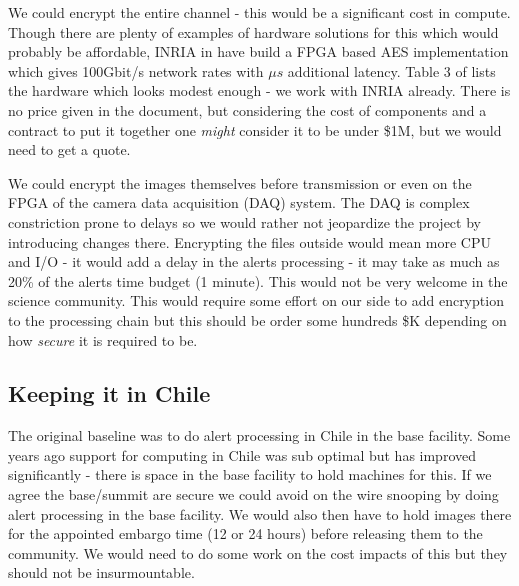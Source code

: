 We could encrypt the entire channel - this would be a significant cost in compute. Though there are plenty of examples of hardware solutions for this which would probably be affordable, INRIA in \cite{10.1007/978-3-642-45073-0_1} have build a FPGA based AES\cite{aes} implementation  which gives 100Gbit/s network rates with $\mu s$ additional latency. Table 3 of \cite{10.1007/978-3-642-45073-0_1} lists the hardware which looks modest enough - we work with INRIA already. There is no price given in the document, but considering the cost of components and a contract to put it together one \emph{might} consider it to be  under \$1M, but we would need to get a quote.

We could encrypt the images themselves before transmission or even on the FPGA of the camera data acquisition (DAQ) system.  The DAQ is complex constriction prone to delays so we would rather not jeopardize the project by introducing changes there. Encrypting the files outside would mean more CPU and I/O - it would add a delay in the alerts processing - it may take as much as 20\% of the alerts time budget (1 minute).  This would not be very welcome in the science community. This would require some effort on our side to add encryption to the processing chain but this should be order some hundreds \$K depending on how \emph{secure} it is required to be.



\subsection{Keeping it in Chile}\label{sec:chile}
The original baseline was to do alert processing in Chile in the base facility. Some years ago support for computing in Chile was sub optimal but has improved significantly - there is space in the base facility to hold machines for this.  If we agree the base/summit are secure we could avoid on the wire snooping by doing alert processing in the base facility. We would also then have to hold images there for the appointed embargo time (12 or 24 hours) before releasing them to the community. We would need to do some work on the cost impacts of this but they should not be insurmountable.
